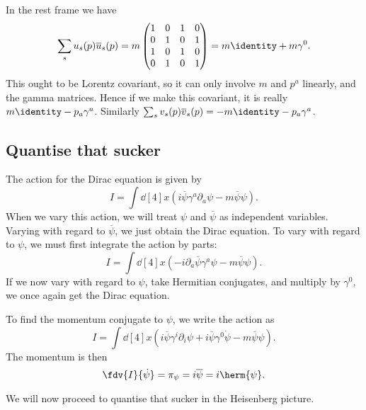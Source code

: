\documentclass{jknotes} %
\begin{document}
In the rest frame we have 
\begin{equation}
    \sum_s u_s(p)\overline{u}_s(p) = m
    \begin{pmatrix}
        1 & 0 & 1 & 0 \\
        0 & 1 & 0 & 1 \\
        1 & 0 & 1 & 0 \\
        0 & 1 & 0 & 1
    \end{pmatrix} = m\identity + m\gamma^0.
\end{equation}
This ought to be Lorentz covariant, so it can only involve \(m\) and \(p^a\) linearly, and the gamma matrices. Hence if we make this covariant, it is really \(m\identity-p_a\gamma^a\). Similarly \(\sum_s v_s(p)\overline{v}_s(p) = -m\identity - p_a\gamma^a\).

\subsection{Quantise that sucker}
The action for the Dirac equation is given by
\begin{equation}
    I = \int \dd[4]{x} (i\overline{\psi}\gamma^a\partial_a\psi - m\overline{\psi}\psi).
\end{equation}
When we vary this action, we will treat \(\psi\) and \(\overline{\psi}\) as independent variables. Varying with regard to \(\overline{\psi}\), we just obtain the Dirac equation. To vary with regard to \(\psi\), we must first integrate the action by parts:
\begin{equation}
    I = \int \dd[4]{x} (-i\partial_a\overline{\psi}\gamma^a\psi-m\overline{\psi}\psi).
\end{equation}
If we now vary with regard to \(\psi\), take Hermitian conjugates, and multiply by \(\gamma^0\), we once again get the Dirac equation.

To find the momentum conjugate to \(\psi\), we write the action as 
\begin{equation}
    I = \int \dd[4]{x} (i\overline{\psi}\gamma^i\partial_i\psi + i\overline{\psi}\gamma^0\dot{\psi} - m\overline{\psi}\psi).
\end{equation}
The momentum is then
\begin{equation}
    \fdv{I}{\dot{\psi}} = \pi_\psi = i\overline{\psi} = i\herm{\psi}.
\end{equation}

We will now proceed to quantise that sucker in the Heisenberg picture.
\end{document}
